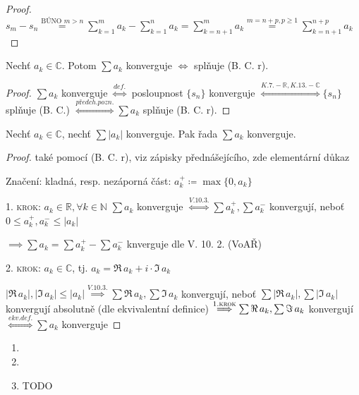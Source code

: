 \begin{proof}
  $s_m - s_n \stackrel{\text{BÚNO }m>n}{=} \sum_{k=1}^{m} a_k - \sum_{k=1}^n a_k = \sum_{k=n+1}^m a_k \stackrel{m=n+p, p\geq 1}{=} \sum_{k=n+1}^{n+p} a_k$
\end{proof}

\begin{veta}\label{10bcrkonv}
  Nechť $a_k \in \mathbb C$. Potom $\sum a_k$ konverguje $\iff$ splňuje (B. C. r).
\end{veta}

\begin{proof}
  $\sum a_k$ konverguje $\stackrel{def.}{\iff}$ posloupnost $\{s_n\}$ konverguje $\stackrel{K. 7. - \mathbb R, K. 13. - \mathbb C}{\iff} \{s_n\}$ splňuje (B. C.) $\stackrel{předch. pozn.}{\iff} \sum a_k$ splňuje (B. C. r).
\end{proof}

\begin{veta}
  Nechť $a_k \in \mathbb C$, nechť $\sum |a_k|$ konverguje. Pak řada $\sum a_k$ konverguje.
\end{veta}

\begin{proof}
  také pomocí (B. C. r), viz zápisky přednášejícího, zde elementární důkaz

  Značení: kladná, resp. nezáporná část: $a_k^+\coloneq \max\{0, a_k\}$

  1. \textsc{krok}: $a_k \in \mathbb R, \forall k \in \mathbb N$
  $\sum a_k$ konverguje $\stackrel{V. 10. 3.}{\iff} \sum a_k^+, \sum a_k^-$ konvergují, neboť $0 \leq a_k^+, a_k^- \leq |a_k|$

  $\implies \sum a_k = \sum a_k^+ - \sum a_k^-$ knverguje dle V. 10. 2. (VoAŘ)

  2. \textsc{krok}: $a_k \in \mathbb C$, tj. $a_k = \Re \, a_k + i\cdot\Im \, a_k$

  $|\Re \, a_k|, |\Im \, a_k| \leq |a_k|\stackrel{V. 10. 3.}{\implies}\sum \Re \, a_k, \sum \Im \, a_k$ konvergují, neboť $\sum |\Re \, a_k|, \sum |\Im \, a_k|$ konvergují absolutně (dle ekvivalentní definice) $\stackrel{1. \textsc{krok}}{\implies} \sum \Re \, a_k, \sum \Im \, a_k$ konvergují $\stackrel{ekv. def.}{\iff} \sum a_k$ konverguje
\end{proof}

\begin{priklad}
  \begin{enumerate}[1)]
    \item
    \item
    \item TODO
  \end{enumerate}
\end{priklad}

